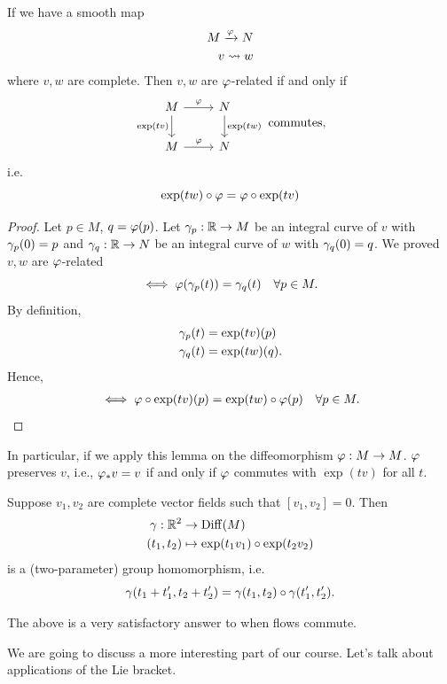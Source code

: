 \begin{lemma}[Functoriality]
  If we have a smooth map \begin{align*}
    M\xrightarrow{\varphi}N \\
    v \leadsto w
  \end{align*} where \(v,w\) are complete. Then \(v,w\) are \(\varphi\)-related if and only if \[
    \begin{tikzcd}
      M \ar{r}{\f} \ar[']{d}{\exp(tv)} & N \ar{d}{\exp(tw)} \\
      M \ar{r}{\f} & N
    \end{tikzcd} \text{ commutes},
  \] i.e.\[
    \exp(tw)\circ\varphi = \varphi\circ\exp(tv)
  \]
\end{lemma}
\begin{proof}
  Let \(p\in M\), \(q = \varphi(p)\). Let \(\gamma_p:\mathbb{R}\to M\) be an integral curve of \(v\) with \(\gamma_p(0) = p\) and \(\gamma_q:\mathbb{R}\to N\) be an integral curve of \(w\) with \(\gamma_q(0) = q\). 
  We proved \(v,w\) are \(\varphi\)-related \[
    \iff \varphi(\gamma_p(t)) = \gamma_q(t) \quad\forall p\in M.
  \]
  By definition, \begin{align*}
    \gamma_p(t) &= \exp(tv)(p) \\
    \gamma_q(t) &= \exp(tw)(q).
  \end{align*}
  Hence, \begin{align*}
    \iff \varphi\circ\exp(tv)(p) = \exp(tw)\circ\varphi(p) \quad\forall p\in M.
  \end{align*}
\end{proof}

In particular, if we apply this lemma on the diffeomorphism \(\varphi:M\to M\).
\(\varphi\) preserves \(v\), i.e., \(\varphi_* v = v\) if and only if \(\varphi\) commutes with \(\exp(tv)\) for all \(t\).

\begin{theorem}
  Suppose \(v_1,v_2\) are complete vector fields such that \([v_1,v_2] = 0\). Then \begin{align*}
    \gamma:\mathbb{R}^2 &\to \operatorname{Diff}(M) \\
    (t_1,t_2) &\mapsto \exp(t_1v_1)\circ\exp(t_2v_2)
  \end{align*} is a (two-parameter) group homomorphism, i.e. \[
    \gamma(t_1 + t_1', t_2 + t_2') = \gamma(t_1,t_2)\circ\gamma(t_1',t_2').
  \]
\end{theorem}
The above is a very satisfactory answer to when flows commute.

We are going to discuss a more interesting part of our course. Let's talk about applications of the Lie bracket.

